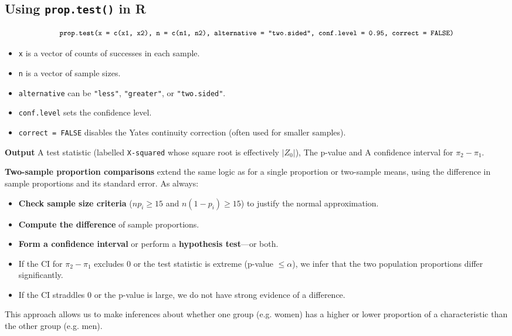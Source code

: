 \documentclass[10pt]{extarticle}
\begin{document}
\subsection{Using \texttt{prop.test()} in R}
$$\small\texttt{prop.test(x = c(x1, x2), n = c(n1, n2), alternative = "two.sided", conf.level = 0.95, correct = FALSE)}$$

\begin{itemize}
    \item \texttt{x} is a vector of counts of successes in each sample.
    \item \texttt{n} is a vector of sample sizes.
    \item \texttt{alternative} can be \texttt{"less"}, \texttt{"greater"}, or \texttt{"two.sided"}.
    \item \texttt{conf.level} sets the confidence level.
    \item \texttt{correct = FALSE} disables the Yates continuity correction (often used for smaller samples).
\end{itemize}

\textbf{Output} A test statistic (labelled \texttt{X-squared} whose square root is effectively $\lvert Z_0\rvert$), The p-value and A confidence interval for $\pi_2 - \pi_1$.

\begin{takeaway-box}{}{}
\small
\textbf{Two-sample proportion comparisons} extend the same logic as for a single proportion or two-sample means, using the difference in sample proportions and its standard error. As always:
\begin{itemize}
    \item \textbf{Check sample size criteria} ($n p_i \ge 15$ and $n (1-p_i) \ge 15$) to justify the normal approximation.
    \item \textbf{Compute the difference} of sample proportions.
    \item \textbf{Form a confidence interval} or perform a \textbf{hypothesis test}---or both.
    \item If the CI for $\pi_2 - \pi_1$ excludes 0 or the test statistic is extreme (p-value $\le \alpha$), we infer that the two population proportions differ significantly.
    \item If the CI straddles 0 or the p-value is large, we do not have strong evidence of a difference.
\end{itemize}
This approach allows us to make inferences about whether one group (e.g. women) has a higher or lower proportion of a characteristic than the other group (e.g. men).
\end{takeaway-box}
\end{document}
